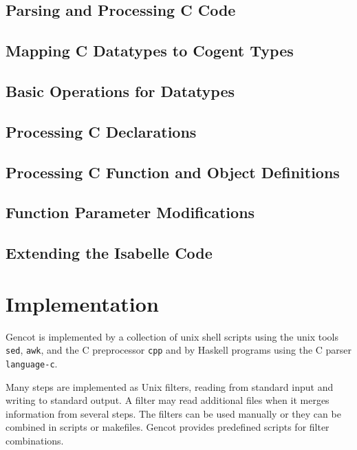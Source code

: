 \documentclass[a4paper]{report}
\newcommand{\code}[1]{\textnormal{\texttt{#1}}}
\begin{document}
\section{Parsing and Processing C Code}
\label{design-ccode}


\section{Mapping C Datatypes to Cogent Types}
\label{design-types}


\section{Basic Operations for Datatypes}
\label{design-operations}


\section{Processing C Declarations}
\label{design-decls}


\section{Processing C Function and Object Definitions}
\label{design-fundefs}


\section{Function Parameter Modifications}
\label{design-parmod}


\section{Extending the Isabelle Code}
\label{design-isabelle}


\chapter{Implementation}

Gencot is implemented by a collection of unix shell scripts using the unix tools \code{sed}, \code{awk}, and the 
C preprocessor \code{cpp} and by Haskell programs using the C parser \code{language-c}. 

Many steps are implemented as Unix filters, reading from standard input and writing to standard output. A filter
may read additional files when it merges information from several steps. The filters
can be used manually or they can be combined in scripts or makefiles. Gencot provides predefined scripts
for filter combinations.
\end{document}
